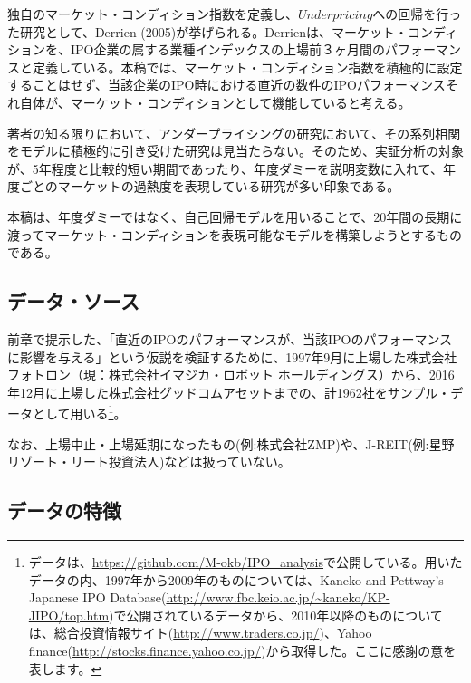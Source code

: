 \documentclass{jsarticle}
\begin{document}
独自のマーケット・コンディション指数を定義し、$Underpricing$への回帰を行った研究として、Derrien (2005)\cite{Derrien}が挙げられる。Derrienは、マーケット・コンディションを、IPO企業の属する業種インデックスの上場前３ヶ月間のパフォーマンスと定義している。本稿では、マーケット・コンディション指数を積極的に設定することはせず、当該企業のIPO時における直近の数件のIPOパフォーマンスそれ自体が、マーケット・コンディションとして機能していると考える。\\ \par


著者の知る限りにおいて、アンダープライシングの研究において、その系列相関をモデルに積極的に引き受けた研究は見当たらない。そのため、実証分析の対象が、5年程度と比較的短い期間であったり、年度ダミーを説明変数に入れて、年度ごとのマーケットの過熱度を表現している研究が多い印象である。\par
本稿は、年度ダミーではなく、自己回帰モデルを用いることで、20年間の長期に渡ってマーケット・コンディションを表現可能なモデルを構築しようとするものである。

\subsection{データ・ソース}
前章で提示した、「直近のIPOのパフォーマンスが、当該IPOのパフォーマンスに影響を与える」という仮説を検証するために、1997年9月に上場した株式会社フォトロン（現：株式会社イマジカ・ロボット ホールディングス）から、2016年12月に上場した株式会社グッドコムアセットまでの、計1962社をサンプル・データとして用いる\footnote[9]{データは、\url{https://github.com/M-okb/IPO_analysis}で公開している。用いたデータの内、1997年から2009年のものについては、Kaneko and Pettway’s Japanese IPO Database(\url{http://www.fbc.keio.ac.jp/~kaneko/KP-JIPO/top.htm})で公開されているデータから、2010年以降のものについては、総合投資情報サイト(\url{http://www.traders.co.jp/})、Yahoo finance(\url{http://stocks.finance.yahoo.co.jp/})から取得した。ここに感謝の意を表します。}。\par
なお、上場中止・上場延期になったもの(例:株式会社ZMP)や、J-REIT(例:星野リゾート・リート投資法人)などは扱っていない。\par

\subsection{データの特徴}
\end{document}
